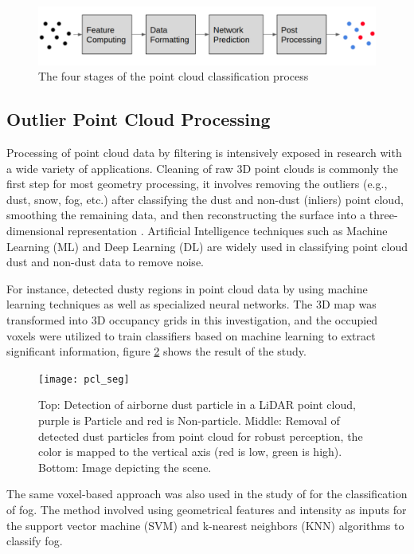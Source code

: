 \begin{figure}[H]
	\centering
	\includegraphics[width=\textwidth]{Figures/four-stage-of-pc-classification-process.png}
	\caption{The four stages of the point cloud classification process}
	\label{fig:The-four-stages-of-the-point-cloud-classification-process}
\end{figure}

\subsection{Outlier Point Cloud Processing}
\label{sub:Point Cloud Processing}
Processing of point cloud data by filtering is intensively exposed in research with a wide variety of applications. Cleaning of raw 3D point clouds is commonly the first step for most geometry processing, it involves removing the outliers (e.g., dust, snow, fog, etc.) after classifying the dust and non-dust (inliers) point cloud, smoothing the remaining data, and then reconstructing the surface into a three-dimensional representation \citep{rakotosaona2020}. Artificial Intelligence techniques such as Machine Learning (ML) and Deep Learning (DL) are widely used in classifying point cloud dust and non-dust data to remove noise.

For instance, \citet{stanislas2018} detected dusty regions in point cloud data by using machine learning techniques as well as specialized neural networks. The 3D map was transformed into 3D occupancy grids in this investigation, and the occupied voxels were utilized to train classifiers based on machine learning to extract significant information, figure \ref{fig:pcl seg} shows the result of the study.

\begin{figure}[H]
	\centering
	\texttt{[image: pcl\_seg]}
	\caption{Top: Detection of airborne dust particle in a LiDAR point cloud, purple is Particle and red is Non-particle. Middle: Removal of detected dust particles from point cloud for robust perception, the color is mapped to the vertical axis (red is low, green is high). Bottom: Image depicting the scene.}
	\label{fig:pcl seg}
\end{figure}

The same voxel-based approach was also used in the study of \citet{shamsudin2016} for the classification of fog. The method involved using geometrical features and intensity as inputs for the support vector machine (SVM) and k-nearest neighbors (KNN) algorithms to classify fog.

